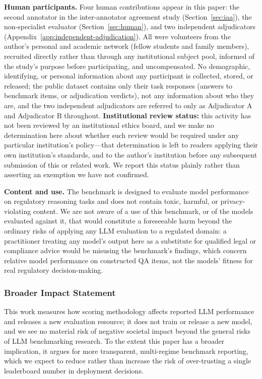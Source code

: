 \textbf{Human participants.} Four human contributions appear in this paper: the second annotator in
the inter-annotator agreement study (Section~\ref{sec:iaa}), the non-specialist evaluator
(Section~\ref{sec:human}), and two independent adjudicators (Appendix~\ref{app:independent-adjudication}).
All were volunteers from the author's personal and academic network (fellow students and family
members), recruited directly rather than through any institutional subject pool, informed of the
study's purpose before participating, and uncompensated. No demographic, identifying, or personal
information about any participant is collected, stored, or released; the public dataset contains
only their task responses (answers to benchmark items, or adjudication verdicts), not any
information about who they are, and the two independent adjudicators are referred to only as
Adjudicator A and Adjudicator B throughout. \textbf{Institutional review status:} this activity has not
been reviewed by an institutional ethics board, and we make no determination here about whether such
review would be required under any particular institution's policy---that determination is left to
readers applying their own institution's standards, and to the author's institution before any
subsequent submission of this or related work. We report this status plainly rather than asserting
an exemption we have not confirmed.

\textbf{Content and use.} The benchmark is designed to evaluate model performance on regulatory
reasoning tasks and does not contain toxic, harmful, or privacy-violating content. We are not aware
of a use of this benchmark, or of the models evaluated against it, that would constitute a
foreseeable harm beyond the ordinary risks of applying any LLM evaluation to a regulated domain: a
practitioner treating any model's output here as a substitute for qualified legal or compliance
advice would be misusing the benchmark's findings, which concern relative model performance on
constructed QA items, not the models' fitness for real regulatory decision-making.

\subsubsection*{Broader Impact Statement}

This work measures how scoring methodology affects reported LLM performance and releases a new
evaluation resource; it does not train or release a new model, and we see no material risk of
negative societal impact beyond the general risks of LLM benchmarking research. To the extent this
paper has a broader implication, it argues for more transparent, multi-regime benchmark reporting,
which we expect to reduce rather than increase the risk of over-trusting a single leaderboard number
in deployment decisions.
